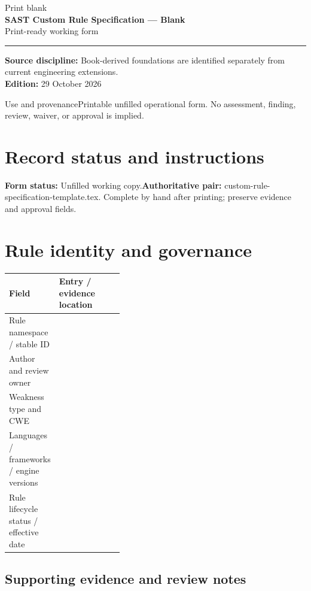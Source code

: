 \documentclass[10pt,letterpaper]{article}
\newcommand{\writearea}[1]{\par\begin{tcolorbox}[colback=white,colframe=linegray,boxrule=0.5pt,height=#1,sharp corners]\mbox{}\end{tcolorbox}\par}
\begin{document}
\hypersetup{pageanchor=false}%
\begin{titlepage}
\vspace*{1.0in}
{\color{bluegray}\Large Print blank}\\[1.0em]
{\color{navy}\Huge\bfseries SAST Custom Rule Specification --- Blank}\\[0.7em]
{\Large Print-ready working form}\\[2.0em]
\rule{\linewidth}{1.0pt}
\vfill
\textbf{Source discipline:} Book-derived foundations are identified separately from current engineering extensions.\\
\textbf{Edition:} 29 October 2026
\end{titlepage}\hypersetup{pageanchor=true}
\tableofcontents
\clearpage
\begin{focusbox}{Use and provenance}Printable unfilled operational form. No assessment, finding, review, waiver, or approval is implied.\end{focusbox}
\section{Record status and instructions}
\textbf{Form status:} Unfilled working copy.\quad\textbf{Authoritative pair:} custom-rule-specification-template.tex. Complete by hand after printing; preserve evidence and approval fields.

\section{Rule identity and governance}
\begin{tabularx}{\linewidth}{@{}p{0.38\linewidth}Y@{}}
\toprule Field & Entry / evidence location\\\midrule
Rule namespace / stable ID & \\[1.0em]
\midrule
Author and review owner & \\[1.0em]
\midrule
Weakness type and CWE & \\[1.0em]
\midrule
Languages / frameworks / engine versions & \\[1.0em]
\midrule
Rule lifecycle status / effective date & \\[1.0em]
\midrule
\end{tabularx}
\subsection{Supporting evidence and review notes}
\writearea{1.45in}
\clearpage
\end{document}
